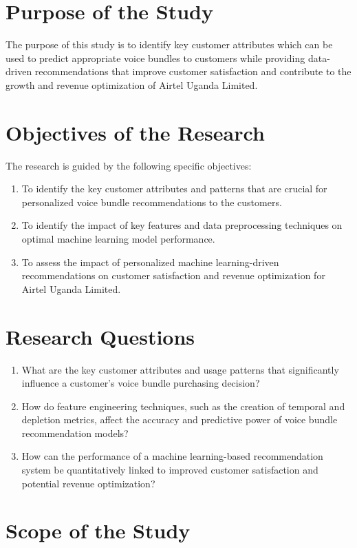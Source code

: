 \documentclass[12pt, a4paper]{report}
\begin{document}
\section{Purpose of the Study}
The purpose of this study is to identify key customer attributes which can be used to predict appropriate voice bundles to customers while providing data-driven recommendations that improve customer satisfaction and contribute to the growth and revenue optimization of Airtel Uganda Limited.

\section{Objectives of the Research}
The research is guided by the following specific objectives:
\begin{enumerate}
    \item To identify the key customer attributes and patterns that are crucial for personalized voice bundle recommendations to the customers.
    \item To identify the impact of key features and data preprocessing techniques on optimal machine learning model performance.
    \item To assess the impact of personalized machine learning-driven recommendations on customer satisfaction and revenue optimization for Airtel Uganda Limited.
\end{enumerate}

\section{Research Questions}
\begin{enumerate}
    \item What are the key customer attributes and usage patterns that significantly influence a customer's voice bundle purchasing decision?
    \item How do feature engineering techniques, such as the creation of temporal and depletion metrics, affect the accuracy and predictive power of voice bundle recommendation models?
    \item How can the performance of a machine learning-based recommendation system be quantitatively linked to improved customer satisfaction and potential revenue optimization?
\end{enumerate}

\section{Scope of the Study}
\end{document}
